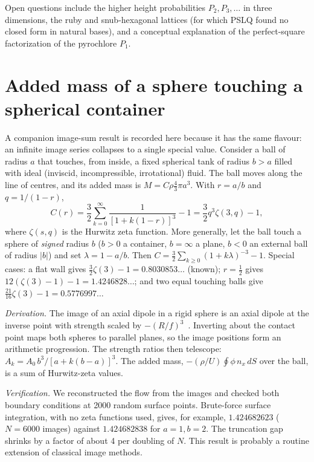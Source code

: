 \documentclass[aps,pre,10pt,twocolumn,superscriptaddress,nofootinbib]{revtex4-2}
\begin{document}
Open questions include the higher height probabilities $P_2,P_3,\ldots$ in three dimensions, the
ruby and snub-hexagonal lattices (for which PSLQ found no closed form in natural bases), and a
conceptual explanation of the perfect-square factorization of the pyrochlore $P_1$.

\appendix

\section{Added mass of a sphere touching a spherical container}
\label{app:added}

A companion image-sum result is recorded here because it has the same flavour: an infinite
image series collapses to a single special value. Consider a ball of radius $a$ that touches, from
inside, a fixed spherical tank of radius $b>a$ filled with ideal (inviscid, incompressible,
irrotational) fluid. The ball moves along the line of centres, and its added mass is
$M=C\rho\tfrac43\pi a^3$. With $r=a/b$ and $q=1/(1-r)$,
\begin{equation}
C(r)=\frac32\sum_{k=0}^\infty\frac1{[1+k(1-r)]^3}-1=\frac32q^3\zeta(3,q)-1,
\end{equation}
where $\zeta(s,q)$ is the Hurwitz zeta function. More generally, let the ball touch a sphere of
\emph{signed} radius $b$ ($b>0$ a container, $b=\infty$ a plane, $b<0$ an external ball of radius
$|b|$) and set $\lambda=1-a/b$. Then $C=\tfrac32\sum_{k\ge0}(1+k\lambda)^{-3}-1$. Special cases:
a flat wall gives $\tfrac32\zeta(3)-1=0.8030853\ldots$ (known); $r=\tfrac12$ gives $12(\zeta(3)-1)-1=1.4246828\ldots$;
and two equal touching balls give $\tfrac{21}{16}\zeta(3)-1=0.5776997\ldots$

\emph{Derivation.} The image of an axial dipole in a rigid sphere is an axial dipole at the
inverse point with strength scaled by $-(R/f)^3$~\cite{Hicks1880,Lamb1932}. Inverting about the contact
point maps both spheres to parallel planes, so the image positions form an arithmetic progression.
The strength ratios then telescope:
$A_k=A_0\,b^3/[a+k(b-a)]^3$. The added mass, $-(\rho/U)\oint\phi\,n_x\,dS$ over the ball, is a sum of
Hurwitz-zeta values.

\emph{Verification.} We reconstructed the flow from the images and checked both boundary conditions at
2000 random surface points. Brute-force surface integration, with no zeta functions used, gives, for example,
$1.424682623$ ($N=6000$ images) against $1.424682838$ for $a=1,b=2$. The truncation gap shrinks by a factor
of about 4 per doubling of $N$. This result is probably a routine extension of classical image methods.
\end{document}
